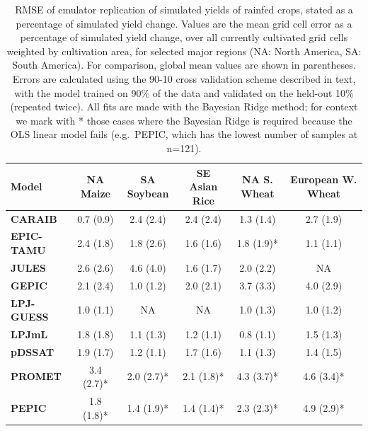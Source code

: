 \documentclass[gmdd]{copernicus} %
\begin{document}
\begin{table}[ht]
    \caption{
    RMSE of emulator replication of simulated yields of rainfed crops, stated as a percentage of simulated yield change.
    Values are the mean grid cell error as a percentage of simulated yield change, over all currently cultivated grid cells weighted by cultivation area, for selected major regions (NA: North America, SA: South America). For comparison, global mean values are shown in parentheses. 
    Errors are calculated using the 90-10 cross validation scheme described in text, with the model trained on 90\% of the data and validated on the held-out 10\% (repeated twice). All fits are made with the Bayesian Ridge method; 
    for context we mark with * those cases where the Bayesian Ridge is required because the OLS linear model fails (e.g.\ PEPIC, which has the lowest number of samples at n=121).
    } 
    \label{table:ASE}
    \begin{tabular}{l | c | c | c | c | c} 
        \hline
        \textbf{Model} & \textbf{NA Maize} & \textbf{SA Soybean} & \textbf{SE Asian Rice} & \textbf{NA S. Wheat} &\textbf{European W. Wheat} \\ \hline
        \textbf{CARAIB}    & 0.7 (0.9)  & 2.4 (2.4)  & 2.4 (2.4)  & 1.3 (1.4)  & 2.7 (1.9)  \\ \hline
        \textbf{EPIC-TAMU} & 2.4 (1.8)  & 1.8 (2.6)  & 1.6 (1.6)  & 1.8 (1.9)* & 1.1 (1.1)  \\ \hline
        \textbf{JULES}     & 2.6 (2.6)  & 4.6 (4.0)  & 1.6 (1.7)  & 2.0 (2.2)  & NA         \\ \hline
        \textbf{GEPIC}     & 2.1 (2.4)  & 1.0 (1.2)  & 2.0 (2.1)  & 3.7 (3.3)  & 4.0 (2.9)  \\ \hline
        \textbf{LPJ-GUESS} & 1.0 (1.1)  & NA         & NA         & 1.0 (1.3)  & 1.0 (1.2)  \\ \hline
        \textbf{LPJmL}     & 1.8 (1.8)  & 1.1 (1.3)  & 1.2 (1.1)  & 0.8 (1.1)  & 1.5 (1.3)  \\ \hline
        \textbf{pDSSAT}    & 1.9 (1.7)  & 1.2 (1.1)  & 1.7 (1.6)  & 1.1 (1.3)  & 1.4 (1.5)  \\ \hline
        \textbf{PROMET}    & 3.4 (2.7)* & 2.0 (2.7)* & 2.1 (1.8)* & 4.3 (3.7)* & 4.6 (3.4)* \\ \hline
        \textbf{PEPIC}     & 1.8 (1.8)* & 1.4 (1.9)* & 1.4 (1.4)* & 2.3 (2.3)* & 4.9 (2.9)* \\ \hline
    \end{tabular}
\end{table}
\end{document}
